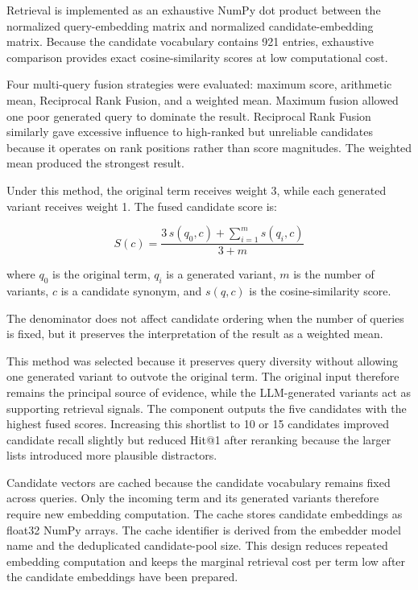 Retrieval is implemented as an exhaustive NumPy dot product between the normalized query-embedding matrix and normalized candidate-embedding matrix. Because the candidate vocabulary contains 921 entries, exhaustive comparison provides exact cosine-similarity scores at low computational cost.

Four multi-query fusion strategies were evaluated: maximum score, arithmetic mean, Reciprocal Rank Fusion, and a weighted mean. Maximum fusion allowed one poor generated query to dominate the result. Reciprocal Rank Fusion similarly gave excessive influence to high-ranked but unreliable candidates because it operates on rank positions rather than score magnitudes. The weighted mean produced the strongest result.

Under this method, the original term receives weight 3, while each generated variant receives weight 1. The fused candidate score is:

\begin{equation}
S(c) = \frac{3\,s(q_0,c) + \sum_{i=1}^{m} s(q_i,c)}{3+m}
\label{eq:weighted-fusion}
\end{equation}

where $q_0$ is the original term, $q_i$ is a generated variant, $m$ is the number of variants, $c$ is a candidate synonym, and $s(q,c)$ is the cosine-similarity score.

The denominator does not affect candidate ordering when the number of queries is fixed, but it preserves the interpretation of the result as a weighted mean.

This method was selected because it preserves query diversity without allowing one generated variant to outvote the original term. The original input therefore remains the principal source of evidence, while the LLM-generated variants act as supporting retrieval signals. The component outputs the five candidates with the highest fused scores. Increasing this shortlist to 10 or 15 candidates improved candidate recall slightly but reduced Hit@1 after reranking because the larger lists introduced more plausible distractors.

Candidate vectors are cached because the candidate vocabulary remains fixed across queries. Only the incoming term and its generated variants therefore require new embedding computation. The cache stores candidate embeddings as float32 NumPy arrays. The cache identifier is derived from the embedder model name and the deduplicated candidate-pool size. This design reduces repeated embedding computation and keeps the marginal retrieval cost per term low after the candidate embeddings have been prepared.

